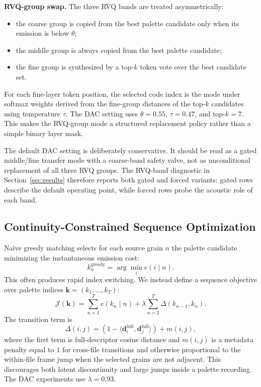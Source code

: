 \documentclass[twoside,a4paper]{article}
\begin{document}
\noindent \textbf{RVQ-group swap.} The three RVQ bands are treated asymmetrically:
\begin{itemize}
    \item the coarse group is copied from the best palette candidate only when its emission is below $\theta$;
    \item the middle group is always copied from the best palette candidate;
    \item the fine group is synthesized by a top-$k$ token vote over the best candidate set.
\end{itemize}
For each fine-layer token position, the selected code index is the mode under softmax weights derived from the fine-group distances of the top-$k$ candidates using temperature $\tau$. The DAC setting uses $\theta=0.55$, $\tau=0.47$, and top-$k=7$. This makes the RVQ-group mode a structured replacement policy rather than a simple binary layer mask.

The default DAC setting is deliberately conservative. It should be read as a gated middle/fine transfer mode with a coarse-band safety valve, not as unconditional replacement of all three RVQ groups. The RVQ-band diagnostic in Section~\ref{sec:results} therefore reports both gated and forced variants: gated rows describe the default operating point, while forced rows probe the acoustic role of each band.

\subsection{Continuity-Constrained Sequence Optimization}

Naïve greedy matching selects for each source grain $n$ the palette candidate minimizing the instantaneous emission cost:
\begin{equation}
    k_n^{\text{greedy}} = \arg\min_i e(i \mid n).
\end{equation}
This often produces rapid index switching. We instead define a sequence objective over palette indices $\mathbf{k} = (k_1,\dots,k_T)$:
\begin{equation}
    \mathcal{J}(\mathbf{k}) =
    \sum_{n=1}^{T} e(k_n \mid n)
    + \lambda \sum_{n=2}^{T} \Delta(k_{n-1}, k_n).
\end{equation}
The transition term is
\begin{equation}
    \Delta(i,j) = \left(1 - \langle \mathbf{d}^{\mathrm{full}}_i,\mathbf{d}^{\mathrm{full}}_j \rangle\right) + m(i,j),
\end{equation}
where the first term is full-descriptor cosine distance and $m(i,j)$ is a metadata penalty equal to $1$ for cross-file transitions and otherwise proportional to the within-file frame jump when the selected grains are not adjacent. This discourages both latent discontinuity and large jumps inside a palette recording. The DAC experiments use $\lambda=0.93$.
\end{document}
